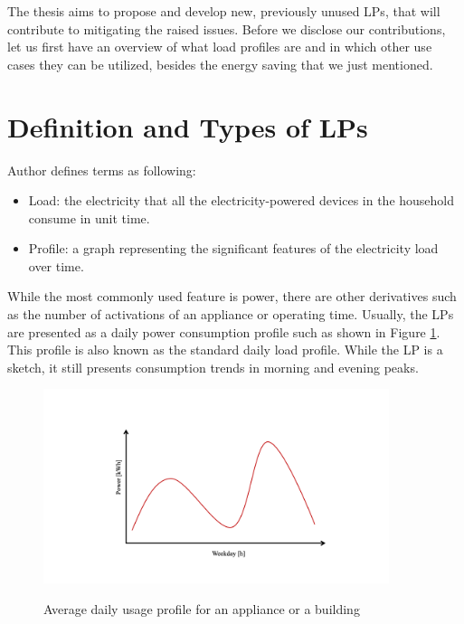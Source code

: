 The thesis aims to propose and develop new, previously unused LPs, that will contribute to mitigating the raised issues. 
Before we disclose our contributions, let us first have an overview of what load profiles are and in which other use cases they can be utilized, besides the energy saving that we just mentioned.


\section{Definition and Types of LPs}
\label{sec:LP_types}
Author \cite{Review2021} defines terms as following:

\begin{itemize}
	\item Load: the electricity that all the electricity-powered devices in the household consume in unit time.
	\item Profile: a graph representing the significant features of the electricity load over time.
\end{itemize}


While the most commonly used feature is power, there are other derivatives such as the number of activations of an appliance or operating time.
Usually, the LPs are presented as a daily power consumption profile such as shown in Figure \ref{fig:daily_power_profile}. 
This profile is also known as the standard daily load profile. 
While the LP is a sketch, it still presents consumption trends in morning and evening peaks.

\begin{figure}[H]
	\centering
	\caption{Average daily usage profile for an appliance or a building}
	\includegraphics[width=0.9\textwidth]{Figures/profile_sketches/Slide1.png}
	\label{fig:daily_power_profile}
\end{figure}

